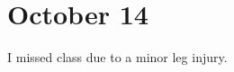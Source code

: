 \documentclass[../notes.tex]{subfiles}
\begin{document}
\section{October 14}
I missed class due to a minor leg injury.
\end{document}
